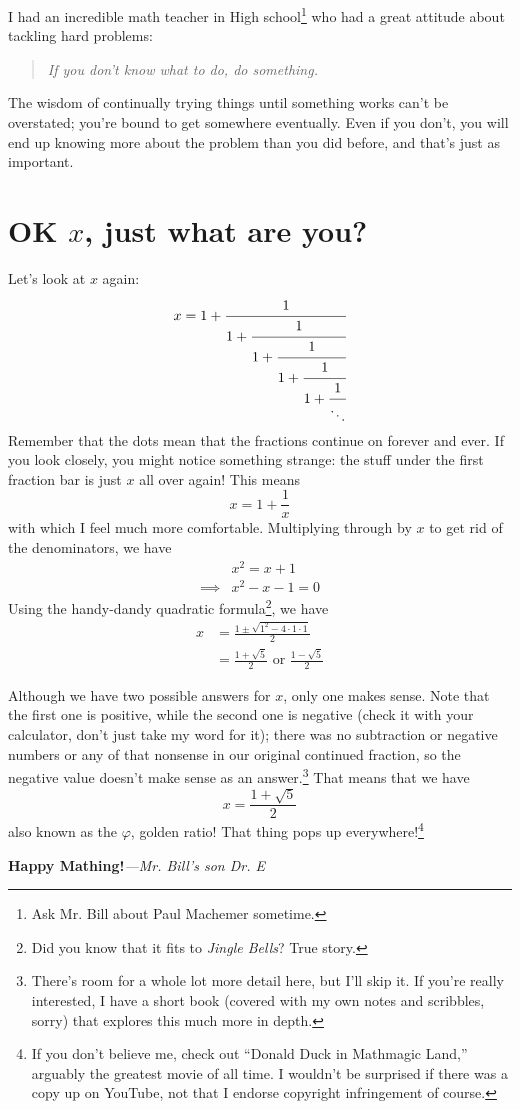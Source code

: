 \documentclass[11pt]{article}
\begin{document}
I had an incredible math teacher in High school\footnote{Ask Mr. Bill about
Paul Machemer sometime.} who had a great attitude about tackling hard problems:
\begin{quotation}
    \textit{If you don't know what to do, do something.}
\end{quotation}
The wisdom of continually trying things until something works can't be
overstated; you're bound to get somewhere eventually.
Even if you don't, you will end up knowing more about the problem than you did
before, and that's just as important.

\section*{OK $x$, just what are you?}
Let's look at $x$ again:
\[
    x = 1 +
        \cfrac{1}
            {1 + \cfrac{1}
                {1 + \cfrac{1}
                    {1 + \cfrac{1}
                        {1 + \cfrac{1}
                            {\ddots}
                        }
                    }
                }
            }
\]
Remember that the dots mean that the fractions continue on forever and ever.
If you look closely, you might notice something strange: the stuff under the
first fraction bar is just $x$ all over again!
This means
\[
    x = 1 + \frac{1}{x}
\]
with which I feel much more comfortable.
Multiplying through by $x$ to get rid of the denominators, we have
\begin{equation*}
    \begin{aligned}
        &x^2 = x + 1\\
        \implies &x^2 - x - 1 = 0
    \end{aligned}
\end{equation*}
Using the handy-dandy quadratic formula\footnote{Did you know that it fits to
\textit{Jingle Bells}? True story.}, we have
\begin{equation*}
    \begin{aligned}
        x &= \frac{1 \pm \sqrt{1^2 - 4 \cdot 1 \cdot 1}}{2}\\
          &= \frac{1 + \sqrt{5}}{2} \textrm{ or } \frac{1 - \sqrt{5}}{2}
    \end{aligned}
\end{equation*}

Although we have two possible answers for $x$, only one makes sense.
Note that the first one is positive, while the second one is negative (check it
with your calculator, don't just take my word for it); there was no subtraction
or negative numbers or any of that nonsense in our original continued fraction,
so the negative value doesn't make sense as an answer.\footnote{There's room
for a whole lot more detail here, but I'll skip it. If you're really
interested, I have a short book (covered with my own notes and scribbles,
sorry) that explores this much more in depth.}
That means that we have
\[
    x = \frac{1 + \sqrt{5}}{2}
\]
also known as the $\varphi$, golden ratio!
That thing pops up everywhere!\footnote{If you don't believe me, check out
``Donald Duck in Mathmagic Land,'' arguably the greatest movie of all time. I
wouldn't be surprised if there was a copy up on YouTube, not that I endorse
copyright infringement of course.}


\textbf{Happy Mathing!}\textit{---Mr. Bill's son Dr. E}
\pagebreak

\end{document}
